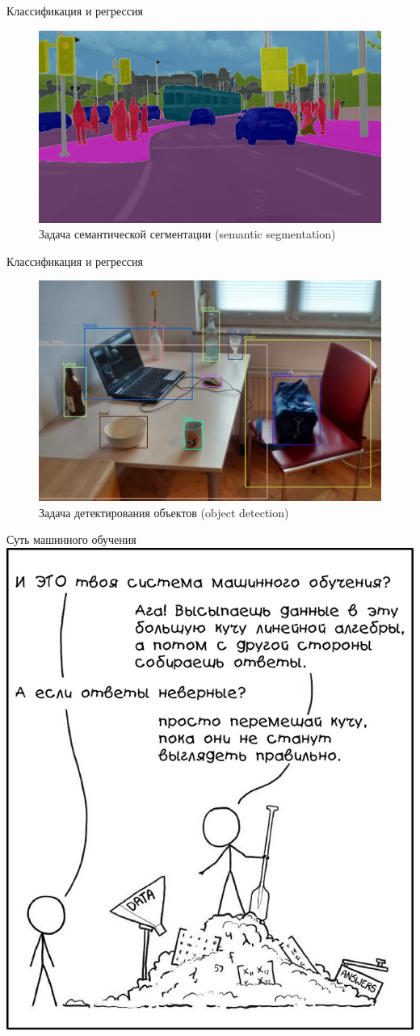 \documentclass[aspectratio=169]{beamer}
\begin{document}
\begin{frame}{Классификация и регрессия}
    \begin{figure}
        \centering
        \includegraphics[width=.69\linewidth]{graphs/fig33.jpg}
        \caption*{Задача семантической сегментации (semantic segmentation)}
    \end{figure}
\end{frame}

\begin{frame}{Классификация и регрессия}
    \begin{figure}
        \centering
        \includegraphics[width=.6\linewidth]{graphs/fig34.jpg}
        \caption*{Задача детектирования объектов (object detection)}
    \end{figure}
\end{frame}

\begin{frame}{Суть машинного обучения}
    \centering
    \includegraphics[width=.4\linewidth]{graphs/fig35.jpg}
\end{frame}
\end{document}
